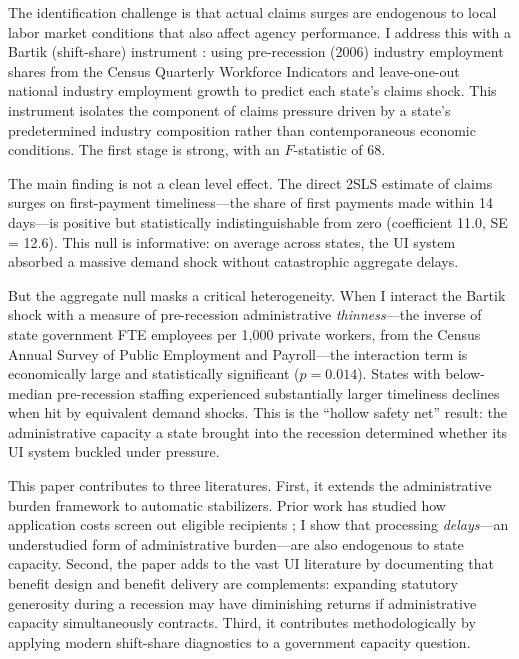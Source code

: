 \documentclass[12pt]{article}
\begin{document}
The identification challenge is that actual claims surges are endogenous to local labor market conditions that also affect agency performance. I address this with a Bartik (shift-share) instrument \citep{bartik1991, blanchard1992}: using pre-recession (2006) industry employment shares from the Census Quarterly Workforce Indicators and leave-one-out national industry employment growth to predict each state's claims shock. This instrument isolates the component of claims pressure driven by a state's predetermined industry composition rather than contemporaneous economic conditions. The first stage is strong, with an $F$-statistic of 68.

The main finding is not a clean level effect. The direct 2SLS estimate of claims surges on first-payment timeliness---the share of first payments made within 14 days---is positive but statistically indistinguishable from zero (coefficient 11.0, SE = 12.6). This null is informative: on average across states, the UI system absorbed a massive demand shock without catastrophic aggregate delays.

But the aggregate null masks a critical heterogeneity. When I interact the Bartik shock with a measure of pre-recession administrative \emph{thinness}---the inverse of state government FTE employees per 1,000 private workers, from the Census Annual Survey of Public Employment and Payroll---the interaction term is economically large and statistically significant ($p = 0.014$). States with below-median pre-recession staffing experienced substantially larger timeliness declines when hit by equivalent demand shocks. This is the ``hollow safety net'' result: the administrative capacity a state brought into the recession determined whether its UI system buckled under pressure.

This paper contributes to three literatures. First, it extends the administrative burden framework \citep{herd2018, deshpande2019, sunstein2019} to automatic stabilizers. Prior work has studied how application costs screen out eligible recipients \citep{currie2006, moffitt1983, finkelstein2019, bhargava2015}; I show that processing \emph{delays}---an understudied form of administrative burden---are also endogenous to state capacity. Second, the paper adds to the vast UI literature \citep{chetty2008, schmieder2016, kroft2016, krueger2002} by documenting that benefit design and benefit delivery are complements: expanding statutory generosity during a recession may have diminishing returns if administrative capacity simultaneously contracts. Third, it contributes methodologically by applying modern shift-share diagnostics \citep{borusyak2022, goldsmithpinkham2020, adao2019} to a government capacity question.
\end{document}
